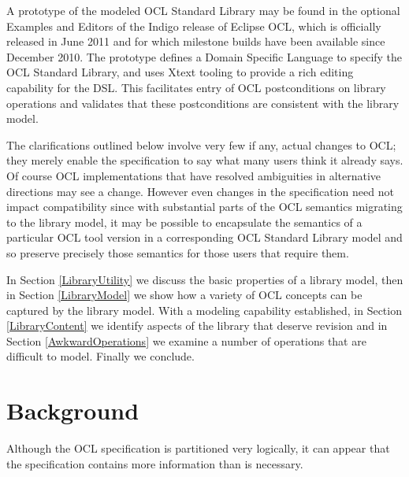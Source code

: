 \documentclass{eceasst}
\begin{document}
A prototype of the modeled OCL Standard Library may be found in the optional Examples and Editors of the Indigo release of Eclipse OCL, which is officially released in June 2011 and for which milestone builds have been available since December 2010. The prototype defines a Domain Specific Language to specify the OCL Standard Library, and uses Xtext tooling to provide a rich editing capability for the DSL. This facilitates entry of OCL postconditions on library operations and validates that these postconditions are consistent with the library model.

The clarifications outlined below involve very few if any, actual changes to OCL; they merely enable the specification to say what many users think it already says. Of course OCL implementations that have resolved ambiguities in alternative directions may see a change. However even changes in the specification need not impact compatibility since with substantial parts of the OCL semantics migrating to the library model, it may be possible to encapsulate the semantics of a particular OCL tool version in a corresponding OCL Standard Library model and so preserve precisely those semantics for those users that require them.

In Section \ref{LibraryUtility} we discuss the basic properties of a library model, then in Section \ref{LibraryModel} we show how a variety of OCL concepts can be captured by the library model. With a modeling capability established, in Section \ref{LibraryContent} we identify aspects of the library that deserve revision and in Section \ref{AwkwardOperations} we examine a number of operations that are difficult to model. Finally we conclude. 

\section{Background}\label{Background}

Although the OCL specification is partitioned very logically, it can appear that the specification contains more information than is necessary.
\end{document}
